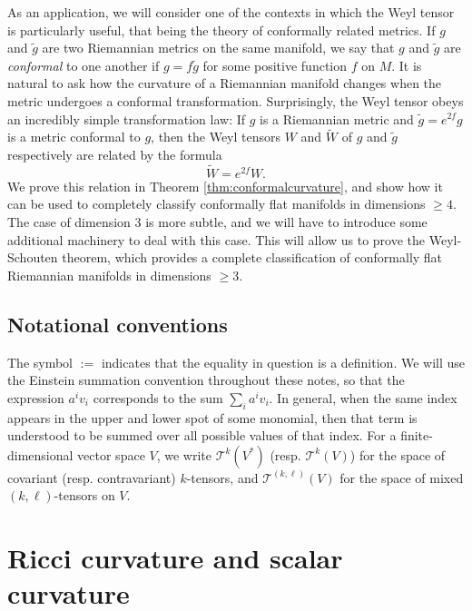 \documentclass{amsart}
\numberwithin{equation}{section}
\def\~#1{\mathscr{#1}}
\theoremstyle{plain}
\theoremstyle{definition}
\theoremstyle{remark}
\begin{document}
As an application, we will consider one of the contexts in which the Weyl tensor is particularly useful, that being the theory of conformally related metrics. If $g$ and $\tilde{g}$ are two Riemannian metrics on the same manifold, we say that $g$ and $\tilde{g}$ are \emph{conformal} to one another if $g = f \tilde{g}$ for some positive function $f$ on $M$. It is natural to ask how the curvature of a Riemannian manifold changes when the metric undergoes a conformal transformation. Surprisingly, the Weyl tensor obeys an incredibly simple transformation law: If $g$ is a Riemannian metric and $\tilde{g} = e^{2f}g$ is a metric conformal to $g$, then the Weyl tensors $W$ and $\widetilde{W}$ of $g$ and $\tilde{g}$ respectively are related by the formula
\[\widetilde{W} = e^{2f}W.\]
We prove this relation in Theorem \ref{thm:conformalcurvature}, and show how it can be used to completely classify conformally flat manifolds in dimensions $\ge 4$. The case of dimension $3$ is more subtle, and we will have to introduce some additional machinery to deal with this case. This will allow us to prove the Weyl-Schouten theorem, which provides a complete classification of conformally flat Riemannian manifolds in dimensions $\ge 3$.

\subsection*{Notational conventions} The symbol $:=$ indicates that the equality in question is a definition. We will use the Einstein summation convention throughout these notes, so that the expression $a^iv_i$ corresponds to the sum $\sum_i a^i v_i$. In general, when the same index appears in the upper and lower spot of some monomial, then that term is understood to be summed over all possible values of that index. For a finite-dimensional vector space $V$, we write $\~T^k(V^*)$ (resp. $\~T^k(V)$) for the space of covariant (resp. contravariant) $k$-tensors, and $\~T^{(k,\ell)}(V)$ for the space of mixed $(k, \ell)$-tensors on $V$.
 
\section{Ricci curvature and scalar curvature}
\end{document}
